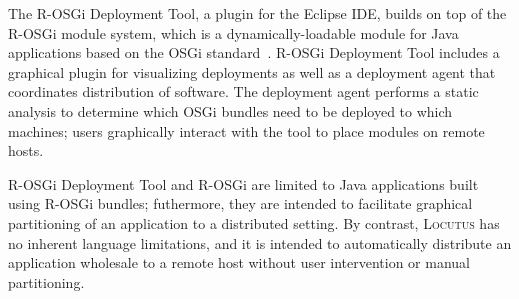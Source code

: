 \documentclass[11pt]{article}
\newcommand{\locutus}{\textsc{Locutus}\xspace}
\newcommand{\rosgig}{R-OSGi Deployment Tool\xspace}
\newcommand{\rosgi}{R-OSGi\xspace}
\begin{document}
The \rosgig, a plugin for the Eclipse IDE, builds on top of the \rosgi module system, which is a dynamically-loadable module for Java applications based on the OSGi standard~\cite{10.5555/1785080.1785082, 10.1145/1328279.1328290}.   \rosgig includes a graphical plugin for visualizing deployments as well as a deployment agent that coordinates distribution of software.  The deployment agent performs a static analysis to determine which OSGi bundles need to be deployed to which machines; users graphically interact with the tool to place modules on remote hosts.

\rosgig and \rosgi are limited to Java applications built using \rosgi bundles; futhermore, they are intended to facilitate graphical partitioning of an application to a distributed setting.  By contrast, \locutus has no inherent language limitations, and it is intended to automatically distribute an application wholesale to a remote host without user intervention or manual partitioning.



\end{document}
